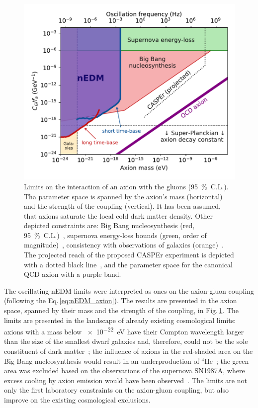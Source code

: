 \begin{figure}
  \centering
  \includegraphics[width=\linewidth]{gfx/axions/psi_ill_axion_limits_v7.pdf}
  \caption{Limits on the interaction of an axion with the gluons (\SI{95}{\percent}~C.L.).
  Tha parameter space is spanned by the axion's mass (horizontal) and the strength of the coupling (vertical).
  It has been assumed, that axions saturate the local cold dark matter density.
  Other depicted constraints are: Big Bang nucleosynthesis (red, \SI{95}{\percent}~C.L.)~\cite{Blum2014,StadnikThesis,Stadnik2015D}, supernova energy-loss bounds (green, order of magnitude)~\cite{Graham2013,Raffelt1990Review,Raffelt2008LNP}, consistency with observations of galaxies (orange)~\cite{Marsh2015Review,Marsh2015B,Schive2015,Marsh2017}.
  The projected reach of the proposed CASPEr experiment is depicted with a dotted black line~\cite{CASPEr2014}, and the parameter space for the canonical QCD axion with a purple band.}
\label{fig:axions_limits_coupling}
\end{figure}

The oscillating-nEDM limits were interpreted as ones on the axion-gluon coupling (following the Eq.\,\ref{eq:nEDM_axion}).
The results are presented in the axion space, spanned by their mass and the strength of the coupling, in Fig.\,\ref{fig:axions_limits_coupling}.
The limits are presented in the landscape of already existing cosmological limits: axions with a mass below \SI{e-22}{\electronvolt} have their Compton wavelength larger than the size of the smallest dwarf galaxies and, therefore, could not be the sole constituent of dark matter~\cite{Marsh2015Review}; the influence of axions in the red-shaded area on the Big Bang nucleosynthesis would result in an underproduction of ${}^4$He~\cite{Blum2014}; the green area was excluded based on the observations of the supernova SN1987A, where excess cooling by axion emission would have been observed~\cite{Graham2013}.
The limits are not only the first laboratory constraints on the axion-gluon coupling, but also improve on the existing cosmological exclusions.




